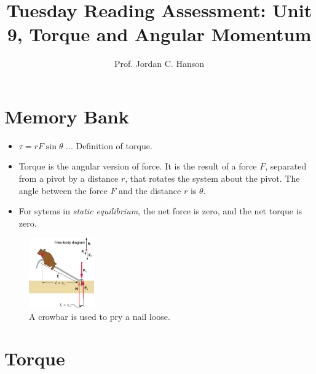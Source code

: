 \documentclass{article}
\begin{document}
\title{Tuesday Reading Assessment: Unit 9, Torque and Angular Momentum}
\author{Prof. Jordan C. Hanson}

\maketitle

\section{Memory Bank}

\begin{itemize}
\item $\tau = r F \sin\theta$ ... Definition of torque.
\item Torque is the angular version of force.  It is the result of a force $F$, separated from a pivot by a distance $r$, that rotates the system about the pivot.  The angle between the force $F$ and the distance $r$ is $\theta$.
\item For sytems in \textit{static equilibrium}, the net force is zero, and the net torque is zero.
\end{itemize}

\begin{figure}[ht]
\centering
\includegraphics[width=0.25\textwidth]{figures/nail1.jpeg}
\caption{\label{fig:torque} A crowbar is used to pry a nail loose.}
\end{figure}

\section{Torque}
\end{document}
